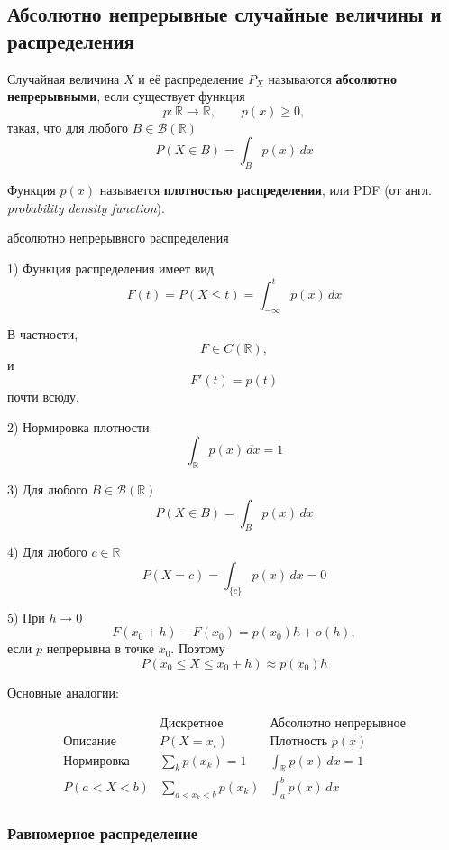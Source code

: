 \documentclass[12pt,a4paper]{article}
\begin{document}
\newpage

\subsection{Абсолютно непрерывные случайные величины и распределения}

\begin{definition}

Случайная величина $X$ и её распределение $P_X$ называются \textbf{абсолютно непрерывными}, если существует функция
\[
p:\mathbb{R}\to\mathbb{R},
\qquad
p(x)\geq0,
\]
такая, что для любого $B\in\mathcal{B}(\mathbb{R})$
\[
P(X\in B)=\int_B p(x)\,dx
\]

Функция $p(x)$ называется \textbf{плотностью распределения}, или PDF (от англ. \textit{probability density function}).

\end{definition}

\begin{props}{абсолютно непрерывного распределения}

1) Функция распределения имеет вид
\[
F(t)=P(X\leq t)
=
\int_{-\infty}^{t}p(x)\,dx
\]

В частности,
\[
F\in C(\mathbb{R}),
\]
и
\[
F'(t)=p(t)
\]
почти всюду.

2) Нормировка плотности:
\[
\int_{\mathbb{R}}p(x)\,dx=1
\]

3) Для любого $B\in\mathcal{B}(\mathbb{R})$
\[
P(X\in B)=\int_Bp(x)\,dx
\]

4) Для любого $c\in\mathbb{R}$
\[
P(X=c)
=
\int_{\{c\}}p(x)\,dx
=
0
\]

5) При $h\to0$
\[
F(x_0+h)-F(x_0)
=
p(x_0)h+o(h),
\]
если $p$ непрерывна в точке $x_0$. Поэтому
\[
P(x_0\leq X\leq x_0+h)
\approx
p(x_0)h
\]

\end{props}

Основные аналогии:

\[
\begin{array}{c|c|c}
 & \text{Дискретное} & \text{Абсолютно непрерывное}\\
\hline
\text{Описание}
&
P(X=x_i)
&
\text{Плотность }p(x)
\\[2mm]
\text{Нормировка}
&
\displaystyle\sum_k p(x_k)=1
&
\displaystyle\int_{\mathbb{R}}p(x)\,dx=1
\\[4mm]
P(a<X<b)
&
\displaystyle\sum_{a<x_k<b}p(x_k)
&
\displaystyle\int_a^b p(x)\,dx
\end{array}
\]

\subsubsection{Равномерное распределение}
\end{document}
